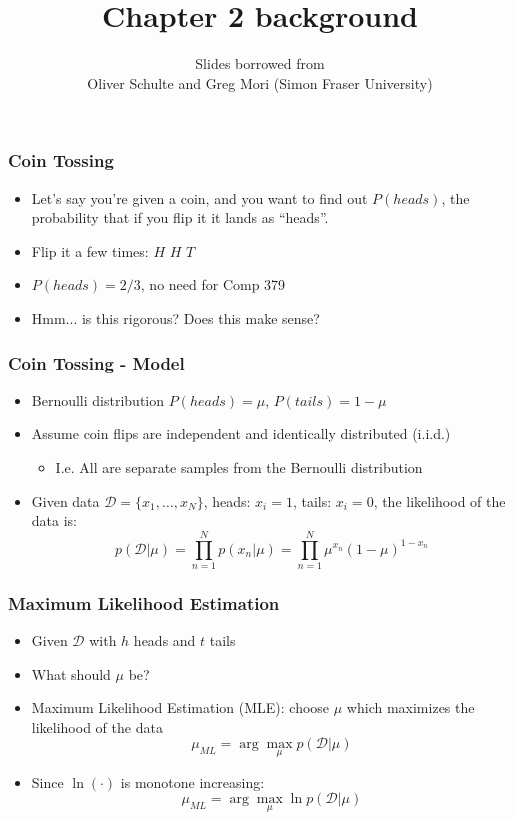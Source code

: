 \documentclass{beamer}
\title{Chapter 2 background}
\subtitle{Slides borrowed from \\Oliver Schulte and Greg Mori (Simon Fraser University)}
\begin{document}
\maketitle

\begin{frame}
  \frametitle{Coin Tossing}
  \begin{itemize}
  \item Let's say you're given a coin, and you want to find out $P(heads)$, the probability that if you flip it it lands as ``heads''.
  \item Flip it a few times: $H$ $H$ $T$
  \item $P(heads)=2/3$, no need for Comp 379
  \item Hmm... is this rigorous?  Does this make sense?
  \end{itemize}
\end{frame}

\begin{frame}
  \frametitle{Coin Tossing - Model}
  \begin{itemize}
  \item Bernoulli distribution $P(heads) = \mu$, $P(tails) = 1 - \mu$
  \item Assume coin flips are independent and identically distributed (i.i.d.)
    \begin{itemize}
    \item I.e. All are separate samples from the Bernoulli distribution
    \end{itemize}
  \item Given data $\mathcal{D} = \{x_1,\ldots,x_N\}$, heads: $x_i=1$, tails: $x_i=0$, the likelihood of the data is: \[p(\mathcal{D}|\mu) = \prod_{n=1}^{N} p(x_n|\mu) = \prod_{n=1}^{N} \mu^{x_n} (1-\mu)^{1-x_n} \]
  \end{itemize}
\end{frame}

\begin{frame}
  \frametitle{Maximum Likelihood Estimation}
  \begin{itemize}
    \item Given $\mathcal{D}$ with $h$ heads and $t$ tails
    \item What should $\mu$ be?
    \item Maximum Likelihood Estimation (MLE): choose $\mu$ which maximizes the likelihood of the data
      \[\mu_{ML} = \arg \max_{\mu} p(\mathcal{D}|\mu)
      \]
    \item Since $\ln(\cdot)$ is monotone increasing:
       \[\mu_{ML} = \arg \max_{\mu} \ln p(\mathcal{D}|\mu)
      \]
  \end{itemize}
\end{frame}
\end{document}

